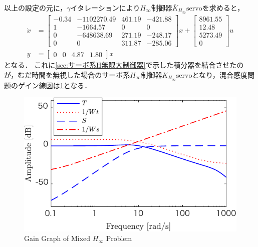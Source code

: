 以上の設定の元に，$\gamma$イタレーションにより$H_\infty$制御器$\bar{K}_{H_\infty}\mathrm{servo}$を求めると，
\begin{align}
    \dot{x} & =
    \begin{bmatrix}
        -0.34&-1102270.49&461.19&-421.88\\
        1&-1664.57&0&0\\
        0&-648638.69&271.19&-248.17\\
        0&0&311.87&-285.06
    \end{bmatrix}
    x+
    \begin{bmatrix}
        8961.55\\12.48\\5273.49\\0
    \end{bmatrix}
    u           \\
    y       & =
    \begin{bmatrix}
        0&0&4.87&1.80
    \end{bmatrix}
    x
\end{align}
となる．
これに\ref{sec:サーボ系H無限大制御器}で示した積分器を結合させたのが，むだ時間を無視した場合のサーボ系$H_\infty$制御器$K_{H_\infty}\mathrm{servo}$となり，混合感度問題のゲイン線図は\figname\ref{fig:HinftyController-crop}となる．
\begin{figure}[t]
    \centering
        \includegraphics[keepaspectratio, scale=1.0]{contents/Appendix_Hinfty/figure/HinftyController-crop.pdf}
        \caption{Gain Graph of Mixed $H_\infty$ Problem}
        \label{fig:HinftyController-crop}
\end{figure}

